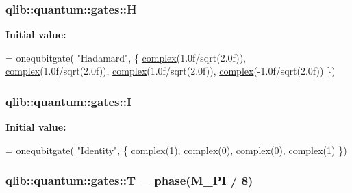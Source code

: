 \subsubsection[{\texorpdfstring{H}{H}}]{ qlib\+::quantum\+::gates\+::H}\hypertarget{namespaceqlib_1_1quantum_1_1gates_a2519bc26f39ef5297d03a5fe7cdf3bc3}{}\label{namespaceqlib_1_1quantum_1_1gates_a2519bc26f39ef5297d03a5fe7cdf3bc3}
{\bfseries Initial value\+:}
\begin{DoxyCode}
= onequbitgate(
    \textcolor{stringliteral}{"Hadamard"}, 
    \{
        \hyperlink{classqlib_1_1math_1_1complex}{complex}(1.0f/sqrt(2.0f)), \hyperlink{classqlib_1_1math_1_1complex}{complex}(1.0f/sqrt(2.0f)),
        \hyperlink{classqlib_1_1math_1_1complex}{complex}(1.0f/sqrt(2.0f)), \hyperlink{classqlib_1_1math_1_1complex}{complex}(-1.0f/sqrt(2.0f))
    \})
\end{DoxyCode}
\subsubsection[{\texorpdfstring{I}{I}}]{ qlib\+::quantum\+::gates\+::I}\hypertarget{namespaceqlib_1_1quantum_1_1gates_a2a7dd0215add2c303251bb3a3ac596cc}{}\label{namespaceqlib_1_1quantum_1_1gates_a2a7dd0215add2c303251bb3a3ac596cc}
{\bfseries Initial value\+:}
\begin{DoxyCode}
= onequbitgate(
    \textcolor{stringliteral}{"Identity"}, 
    \{
        \hyperlink{classqlib_1_1math_1_1complex}{complex}(1), \hyperlink{classqlib_1_1math_1_1complex}{complex}(0),
        \hyperlink{classqlib_1_1math_1_1complex}{complex}(0), \hyperlink{classqlib_1_1math_1_1complex}{complex}(1)
    \})
\end{DoxyCode}
\subsubsection[{\texorpdfstring{T}{T}}]{ qlib\+::quantum\+::gates\+::T = {\bf phase}({\bf M\+\_\+\+PI} / 8)}\hypertarget{namespaceqlib_1_1quantum_1_1gates_a9b72e189dcf40679247251dff199887d}{}\label{namespaceqlib_1_1quantum_1_1gates_a9b72e189dcf40679247251dff199887d}
